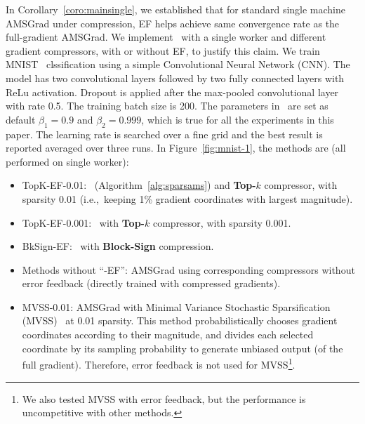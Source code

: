\documentclass[11pt]{article}
\begin{document}
In Corollary~\ref{coro:mainsingle}, we established that for standard single machine AMSGrad under compression, EF helps achieve same convergence rate as the full-gradient AMSGrad. We implement \algo\ with a single worker and different gradient compressors, with or without EF, to justify this claim. We train MNIST~\cite{mnist} clssification using a simple Convolutional Neural Network (CNN). The model has two convolutional layers followed by two fully connected layers with ReLu activation. Dropout is applied after the max-pooled convolutional layer with rate 0.5. The training batch size is 200. The parameters in \algo\ are set as default $\beta_1=0.9$ and $\beta_2=0.999$, which is true for all the experiments in this paper. The learning rate is searched over a fine grid and the best result is reported averaged over three runs. In Figure~\ref{fig:mnist-1}, the methods are (all performed on single worker):
\begin{itemize}
    \item TopK-EF-0.01: \algo\ (Algorithm~\ref{alg:sparsams}) and \textbf{Top-$k$} compressor, with sparsity 0.01 (i.e.,~keeping 1\% gradient coordinates with largest magnitude).
    
    \item TopK-EF-0.001: \algo\ with \textbf{Top-$k$} compressor, with sparsity 0.001.
    
    \item BkSign-EF: \algo\ with \textbf{Block-Sign} compression.
    
    \item Methods without ``-EF'':  AMSGrad using corresponding compressors without error feedback (directly trained with compressed gradients).
    
    \item MVSS-0.01: AMSGrad with Minimal Variance Stochastic Sparsification (MVSS)~\cite{wangni2018gradient} at 0.01 sparsity. This method probabilistically chooses gradient coordinates according to their magnitude, and divides each selected coordinate by its sampling probability to generate unbiased output (of the full gradient). Therefore, error feedback is not used for MVSS\footnote{We also tested MVSS with error feedback, but the performance is uncompetitive with other methods.}.
\end{itemize}
\end{document}
